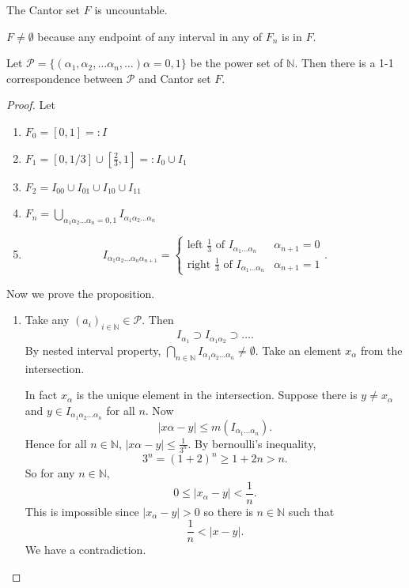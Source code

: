 \begin{theorem}
	The Cantor set $F$ is uncountable.
\end{theorem}
\begin{claim}
$F \neq \emptyset $ because any endpoint of any interval in any of $F_n$ is in $F$.
\end{claim}
\begin{proposition}
	Let $\mathcal{P}=\{\left( \alpha_1,\alpha_2,\ldots\alpha_n,  \ldots \right) \alpha=0,1 \} $ be the power set of  $\mathbb{N}$.
	Then there is a 1-1 correspondence between $\mathcal{P}$ and Cantor set $F$.
\end{proposition}
\begin{proof}
Let 
\begin{enumerate}
	\item $F_0 = [0,1] =: I$
	\item $F_1 = [0,1/3] \cup [\frac{2}{3}, 1] =: I_0 \cup  I_1$
	\item $F_2 = I_{00}\cup I_{01} \cup I_{10}\cup I_{11}$
	\item $F_n = \bigcup_{\alpha_1 \alpha_2 \ldots \alpha_n = 0,1} I_{\alpha_1 \alpha_2 \ldots \alpha_n}$ 
	\item  \[
	I_{\alpha_1 \alpha_2 \ldots\alpha_n \alpha_{n+1}}=\begin{cases}
		\text{left }\frac{1}{3} \text{ of } I_{\alpha_1\ldots \alpha_n} & \alpha_{n+1} = 0\\
		\text{right }\frac{1}{3} \text{ of } I_{\alpha_1\ldots \alpha_n} & \alpha_{n+1} = 1
	\end{cases}
	.\] 
\end{enumerate}
Now we prove the proposition.
\begin{enumerate}
	\item
Take any $\left( a_i \right)_{i \in \mathbb{N}} \in \mathcal{P}$. Then \[
I_{\alpha_1} \supset I_{\alpha_1\alpha_2} \supset \ldots
.\] 
By nested interval property, $\bigcap_{n \in \mathbb{N}} I_{\alpha_1\alpha_2\ldots\alpha_n} \neq \emptyset$. Take an element $x_\alpha$ from the intersection.

In fact $x_\alpha$ is the unique element in the intersection.  Suppose there is $y \neq  x_{\alpha}$ and $y \in I_{\alpha_1\alpha_2\ldots \alpha_n}$ for all $n$. Now \[
|x\alpha-y| \le  m\left( I_{\alpha_1 \ldots \alpha_n} \right) 
.\] 
Hence for all $n \in \mathbb{N}$, $|x\alpha-y|\le \frac{1}{3^n}$. By bernoulli's inequality, \[
3^n = (1+2)^n \ge 1+2n > n
.\] 
So for any $n \in \mathbb{N}$, 
\[
0\le |x_\alpha - y | < \frac{1}{n}
.\] 
This is impossible since $|x_\alpha-y| >0$ so there is $n \in \mathbb{N}$ such that \[
\frac{1}{n} < |x-y|
.\] We have a contradiction.


\end{enumerate}
\end{proof}
